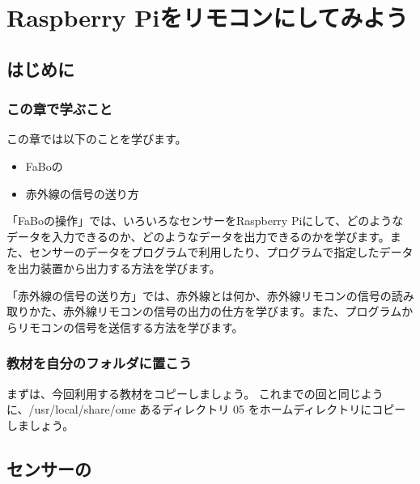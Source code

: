 \chapter{Raspberry Piをリモコンにしてみよう}
\section{はじめに}
\subsection{この章で学ぶこと}

この章では以下のことを学びます。
\begin{itemize}
\item FaBoの
\item 赤外線の信号の送り方
\end{itemize}

「FaBoの操作」では、いろいろなセンサーをRaspberry Piにして、どのようなデータを入力できるのか、どのようなデータを出力できるのかを学びます。また、センサーのデータをプログラムで利用したり、プログラムで指定したデータを出力装置から出力する方法を学びます。

「赤外線の信号の送り方」では、赤外線とは何か、赤外線リモコンの信号の読み取りかた、赤外線リモコンの信号の出力の仕方を学びます。また、プログラムからリモコンの信号を送信する方法を学びます。

\subsection{教材を自分のフォルダに置こう}
まずは、今回利用する教材をコピーしましょう。
これまでの回と同じように、\nobreak/usr/local/share/ome あるディレクトリ 05 をホームディレクトリにコピーしましょう。

\newpage
\section{センサーの}
